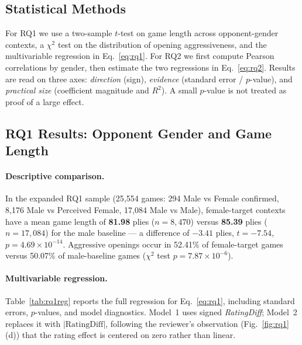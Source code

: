 \documentclass[11pt,a4paper]{article}
\begin{document}
\subsection{Statistical Methods}
For RQ1 we use a two-sample $t$-test on game length across opponent-gender contexts, a
$\chi^2$ test on the distribution of opening aggressiveness, and the multivariable regression
in Eq.~\eqref{eq:rq1}. For RQ2 we first compute Pearson correlations by gender, then estimate
the two regressions in Eq.~\eqref{eq:rq2}. Results are read on three axes: \emph{direction}
(sign), \emph{evidence} (standard error / $p$-value), and \emph{practical size} (coefficient
magnitude and $R^2$). A small $p$-value is not treated as proof of a large effect.

\subsection{RQ1 Results: Opponent Gender and Game Length}
\label{sec:rq1res}
\paragraph{Descriptive comparison.}
In the expanded RQ1 sample (25{,}554 games: 294 Male vs Female confirmed, 8{,}176 Male vs
Perceived Female, 17{,}084 Male vs Male), female-target contexts have a mean game length of
\textbf{81.98} plies ($n=8{,}470$) versus \textbf{85.39} plies ($n=17{,}084$) for the
male baseline --- a difference of $-3.41$ plies, $t=-7.54$, $p=4.69\times10^{-14}$. Aggressive
openings occur in 52.41\% of female-target games versus 50.07\% of male-baseline games
($\chi^2$ test $p=7.87\times10^{-6}$).

\paragraph{Multivariable regression.}
Table~\ref{tab:rq1reg} reports the full regression for Eq.~\eqref{eq:rq1}, including standard
errors, $p$-values, and model diagnostics. Model~1 uses signed \textit{RatingDiff}; Model~2
replaces it with $|\text{RatingDiff}|$, following the reviewer's observation
(Fig.~\ref{fig:rq1}(d)) that the rating effect is centered on zero rather than linear.
\end{document}
